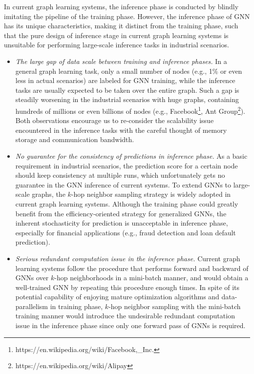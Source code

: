 \documentclass[conference]{IEEEtran}
\begin{document}
In current graph learning systems\cite{b13,b14,b15,b16}, the inference phase is conducted by blindly imitating the pipeline of the training phase. However, the inference phase of GNN has its  unique characteristics, making it distinct from the training phase, such that the pure design of inference stage in current graph learning systems is unsuitable for performing large-scale inference tasks in industrial scenarios.
\begin{itemize}
    \item \emph{The large gap of data scale between training and inference phases.} 
    In a general graph learning task, only a small number of nodes (e.g., 1\% or even less in actual scenarios) are labeled for GNN training, while the inference tasks are usually expected to be taken over the entire graph. Such a gap is steadily worsening in the industrial scenarios with huge graphs, containing hundreds of millions or even billions of nodes\cite{b17, ab18, ab19} (e.g., Facebook\footnote{https://en.wikipedia.org/wiki/Facebook,\_Inc.}, Ant Group\footnote{https://en.wikipedia.org/wiki/Alipay}). Both observations encourage us to re-consider the scalability issue encountered in the inference tasks with the careful thought of memory storage and communication bandwidth.
    \item \emph{No guarantee for the consistency of predictions in inference phase.}
    As a basic requirement in industrial scenarios, the prediction score for a certain node should keep consistency at multiple runs, which unfortunately gets no guarantee in the GNN inference of current systems. To extend GNNs to large-scale graphs, the $k$-hop neighbor sampling strategy is widely adopted in current graph learning systems\cite{b13,b14,b15,b16,b17,b17append}. Although the training phase could greatly benefit from the efficiency-oriented strategy for generalized GNNs, the inherent stochasticity for prediction is unacceptable in inference phase,  especially for financial applications (e.g., fraud detection and loan default prediction\cite{b12, ab16}).
    \item \emph{Serious redundant computation issue in the inference phase.} 
    Current graph learning systems\cite{b13,b14,b15,b16} follow the procedure that performs forward and backward of GNNs over $k$-hop neighborhoods in a mini-batch manner, and would obtain a well-trained GNN by repeating this procedure enough times. In spite of its potential capability of enjoying mature optimization algorithms and data-parallelism in training phase, $k$-hop neighbor sampling with the mini-batch training manner would introduce the undesirable redundant computation issue in the inference phase since only one forward pass of GNNs is required. 
\end{itemize}
\end{document}
